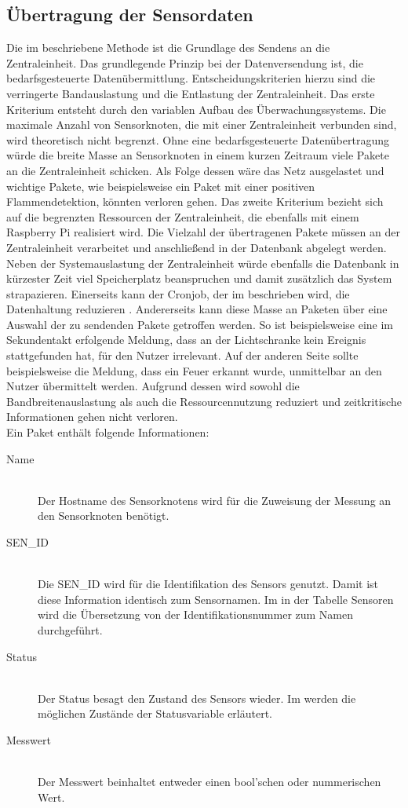 \subsection{Übertragung der Sensordaten}\label{Sensorknoten:JSON}
Die im  beschriebene Methode ist die Grundlage des Sendens an die Zentraleinheit. Das grundlegende Prinzip bei der Datenversendung ist, die bedarfsgesteuerte Datenübermittlung. Entscheidungskriterien hierzu sind die verringerte Bandauslastung und die Entlastung der Zentraleinheit. Das erste Kriterium entsteht durch den variablen Aufbau des Überwachungssystems. Die maximale Anzahl von Sensorknoten, die mit einer Zentraleinheit verbunden sind, wird theoretisch nicht begrenzt. Ohne eine bedarfsgesteuerte Datenübertragung würde die breite Masse an Sensorknoten in einem kurzen Zeitraum viele Pakete an die Zentraleinheit schicken. Als Folge dessen wäre das Netz ausgelastet und wichtige Pakete, wie beispielsweise ein Paket mit einer positiven Flammendetektion, könnten verloren gehen. Das zweite Kriterium bezieht sich auf die begrenzten Ressourcen der Zentraleinheit, die ebenfalls mit einem Raspberry Pi realisiert wird. Die Vielzahl der übertragenen Pakete müssen an der Zentraleinheit verarbeitet und anschließend in der Datenbank abgelegt werden. Neben der Systemauslastung der Zentraleinheit würde ebenfalls die Datenbank in kürzester Zeit viel Speicherplatz beanspruchen und damit zusätzlich das System strapazieren. Einerseits kann der Cronjob, der im  beschrieben wird, die Datenhaltung reduzieren . Andererseits kann diese Masse an Paketen über eine Auswahl der zu sendenden Pakete getroffen werden. So ist beispielsweise eine im Sekundentakt erfolgende Meldung, dass an der Lichtschranke kein Ereignis stattgefunden hat, für den Nutzer irrelevant. Auf der anderen Seite sollte beispielsweise die Meldung, dass ein Feuer erkannt wurde, unmittelbar an den Nutzer übermittelt werden. Aufgrund dessen wird sowohl die Bandbreitenauslastung als auch die Ressourcennutzung reduziert und zeitkritische Informationen gehen nicht verloren.\\
Ein Paket enthält folgende Informationen:
\begin{description}
	\item[Name] \hfill \\
		Der Hostname des Sensorknotens wird für die Zuweisung der Messung an den Sensorknoten benötigt.
	\item[SEN\_ID] \hfill \\
		Die SEN\_ID wird für die Identifikation des Sensors genutzt. Damit ist diese Information identisch zum Sensornamen. Im  in der Tabelle Sensoren wird die Übersetzung von der Identifikationsnummer zum Namen durchgeführt.
	\item[Status] \hfill \\
		Der Status besagt den Zustand des Sensors wieder. Im  werden die möglichen Zustände der Statusvariable erläutert.
	\item[Messwert] \hfill \\
		Der Messwert beinhaltet entweder einen bool'schen oder nummerischen Wert.
\end{description} 
